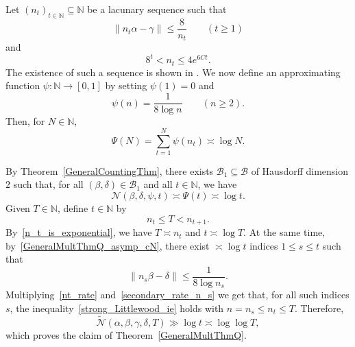 \documentclass[12pt, reqno]{amsart}
\theoremstyle{definition}
\theoremstyle{remark}
\numberwithin{equation}{section}
\def\ls{\leqslant} \def\gs{\geqslant}
\def\leq{\leqslant}
\def \bN {\mathbb N}
\def \cB {\mathcal B}
\def \cN {\mathcal N}
\begin{document}
Let $(n_t)_{t\in \bN} \subseteq \bN$ be a lacunary sequence such that 
\begin{equation}\label{nt_rate} \|n_t\alpha - \gamma\| \ls \frac{8}{n_t} \qquad (t\gs 1)  \end{equation}
and
\begin{equation} \label{n_t_is_exponential}
8^t<n_t\leq 4e^{6Ct}.
\end{equation}
The existence of such a sequence is shown in \cite[Lemma 2.1]{CZ2021}. We now define an approximating function $\psi:\mathbb{N}\to [0,1]$ by setting $\psi(1)=0$ and 
\[ \psi(n) = \frac{1}{8 \log n} \qquad (n \gs 2). \]
Then, for $N\in\bN$,
\[
\Psi(N)=\sum_{t=1}^N\psi(n_t)\asymp \log N.
\]

By Theorem~\ref{GeneralCountingThm}, there exists $\cB_1 \subseteq \cB$ of Hausdorff dimension $2$ such that, for all $(\beta,\delta)\in \cB_1$ and all $t\in\bN$, we have
\begin{equation} \label{GeneralMultThmQ_asymp_cN}
\cN(\beta,\delta,\psi,t)\asymp\Psi(t)\asymp\log t.
\end{equation}
Given $T\in\bN$, define $t\in\bN$ by
\[
n_t\leq T < n_{t+1}.
\]
By~\eqref{n_t_is_exponential}, we have $T\asymp n_t$ and $t\asymp\log T$. At the same time, by~\eqref{GeneralMultThmQ_asymp_cN}, there exist $\asymp \log t$ indices $1\leq s\leq t$ such that
\begin{equation} \label{secondary_rate_n_s}
\|n_s\beta - \delta\| \ls\frac{1}{8\log n_s}.
\end{equation}
Multiplying~\eqref{nt_rate} and~\eqref{secondary_rate_n_s} we get that, for all such indices $s$, the inequality~\eqref{strong_Littlewood_ie} holds with $n=n_s\leq n_t\leq T$. 
Therefore,
\[
\widetilde{\cN}(\alpha,\beta,\gamma,\delta,T)\gg \log t\asymp \log\log T,
\]
which proves the claim of Theorem~\ref{GeneralMultThmQ}.
\end{document}
